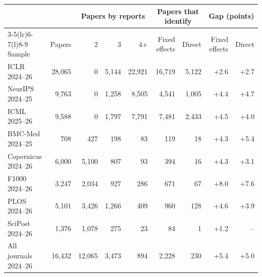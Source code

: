 \begin{tabular}{@{}lrrrrrrrr@{}}
\toprule
 & & \multicolumn{3}{c}{Papers by reports} & \multicolumn{2}{c}{Papers that identify} & \multicolumn{2}{c}{Gap (points)} \\
\cmidrule(lr){3-5}\cmidrule(lr){6-7}\cmidrule(l){8-9}
Sample & Papers & 2 & 3 & 4+ & Fixed effects & Direct & Fixed effects & Direct \\
\midrule
ICLR 2024–26 & 28,065 & 0 & 5,144 & 22,921 & 16,719 & 5,122 & +2.6 & +2.7 \\
NeurIPS 2024–25 & 9,763 & 0 & 1,258 & 8,505 & 4,541 & 1,005 & +4.4 & +4.7 \\
ICML 2025–26 & 9,588 & 0 & 1,797 & 7,791 & 7,481 & 2,433 & +4.5 & +4.0 \\
BMC-Med 2024–25 & 708 & 427 & 198 & 83 & 119 & 18 & +4.3 & +5.4 \\
Copernicus 2024–26 & 6,000 & 5,100 & 807 & 93 & 394 & 16 & +4.3 & +3.1 \\
F1000 2024–26 & 3,247 & 2,034 & 927 & 286 & 671 & 67 & +8.0 & +7.6 \\
PLOS 2024–26 & 5,101 & 3,426 & 1,266 & 409 & 960 & 128 & +4.6 & +3.9 \\
SciPost 2024–26 & 1,376 & 1,078 & 275 & 23 & 84 & 1 & +1.2 & -- \\
All journals 2024–26 & 16,432 & 12,065 & 3,473 & 894 & 2,228 & 230 & +5.4 & +5.0 \\
\bottomrule
\end{tabular}
